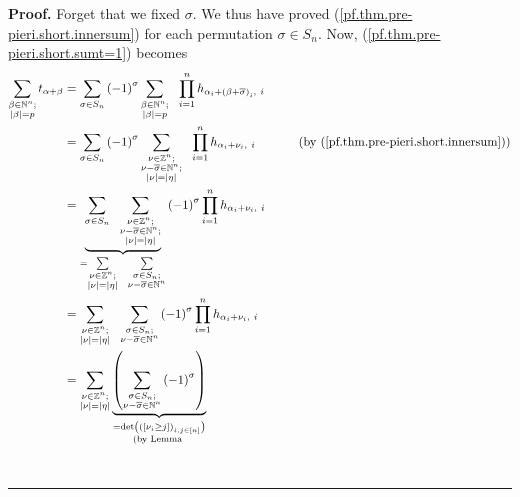 \documentclass[numbers=enddot,12pt,final,onecolumn,notitlepage,english]{scrartcl}%
\theoremstyle{definition}
\newenvironment{proof}[1][Proof]{\noindent\textbf{#1.} }{\ \rule{0.5em}{0.5em}}
\let\sumnonlimits\sum
\let\prodnonlimits\prod
\renewcommand{\sum}{\sumnonlimits\limits}
\renewcommand{\prod}{\prodnonlimits\limits}
\newenvironment{vershort}{}{}
\begin{document}
\begin{vershort}
\begin{proof}
Forget that we fixed $\sigma$. We thus have proved
(\ref{pf.thm.pre-pieri.short.innersum}) for each permutation $\sigma\in S_{n}%
$. Now, (\ref{pf.thm.pre-pieri.short.sumt=1}) becomes%
\begin{align}
\sum_{\substack{\beta\in\mathbb{N}^{n};\\\left\vert \beta\right\vert
=p}}t_{\alpha+\beta}  &  =\sum_{\sigma\in S_{n}}\left(  -1\right)  ^{\sigma
}\sum_{\substack{\beta\in\mathbb{N}^{n};\\\left\vert \beta\right\vert
=p}}\ \ \prod_{i=1}^{n}h_{\alpha_{i}+\left(  \beta+\overline{\sigma}\right)
_{i},\ i}\nonumber\\
&  =\sum_{\sigma\in S_{n}}\left(  -1\right)  ^{\sigma}\sum_{\substack{\nu
\in\mathbb{Z}^{n};\\\nu-\overline{\sigma}\in\mathbb{N}^{n};\\\left\vert
\nu\right\vert =\left\vert \eta\right\vert }}\ \ \prod_{i=1}^{n}h_{\alpha
_{i}+\nu_{i},\ i}\ \ \ \ \ \ \ \ \ \ \left(  \text{by
(\ref{pf.thm.pre-pieri.short.innersum})}\right) \nonumber\\
&  =\underbrace{\sum_{\sigma\in S_{n}}\ \ \sum_{\substack{\nu\in\mathbb{Z}%
^{n};\\\nu-\overline{\sigma}\in\mathbb{N}^{n};\\\left\vert \nu\right\vert
=\left\vert \eta\right\vert }}}_{=\sum_{\substack{\nu\in\mathbb{Z}%
^{n};\\\left\vert \nu\right\vert =\left\vert \eta\right\vert }}\ \ \sum
_{\substack{\sigma\in S_{n};\\\nu-\overline{\sigma}\in\mathbb{N}^{n}}}}\left(
-1\right)  ^{\sigma}\prod_{i=1}^{n}h_{\alpha_{i}+\nu_{i},\ i}\nonumber\\
&  =\sum_{\substack{\nu\in\mathbb{Z}^{n};\\\left\vert \nu\right\vert
=\left\vert \eta\right\vert }}\ \ \sum_{\substack{\sigma\in S_{n}%
;\\\nu-\overline{\sigma}\in\mathbb{N}^{n}}}\left(  -1\right)  ^{\sigma}%
\prod_{i=1}^{n}h_{\alpha_{i}+\nu_{i},\ i}\nonumber\\
&  =\sum_{\substack{\nu\in\mathbb{Z}^{n};\\\left\vert \nu\right\vert
=\left\vert \eta\right\vert }}\underbrace{\left(  \sum_{\substack{\sigma\in
S_{n};\\\nu-\overline{\sigma}\in\mathbb{N}^{n}}}\left(  -1\right)  ^{\sigma
}\right)  }_{\substack{=\det\left(  \left(  \left[  \nu_{i}\geq j\right]
\right)  _{i,j\in\left[  n\right]  }\right)  \\\text{(by Lemma
}}}
\end{align}
\end{proof}
\end{vershort}
\end{document}

